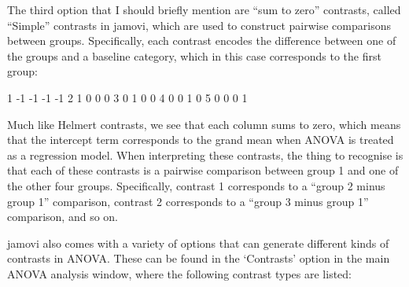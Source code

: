  
The third option that I should briefly mention are ``sum to zero'' contrasts, called ``Simple'' contrasts in jamovi, which are used to construct pairwise comparisons between groups. Specifically, each contrast encodes the difference between one of the groups and a baseline category, which in this case corresponds to the first group: 
\begin{rblock1}
1   -1   -1   -1   -1
2    1    0    0    0
3    0    1    0    0
4    0    0    1    0
5    0    0    0    1
\end{rblock1}  
Much like Helmert contrasts, we see that each column sums to zero, which means that the intercept term corresponds to the grand mean when ANOVA is treated as a regression model. When interpreting these contrasts, the thing to recognise is that each of these contrasts is a pairwise comparison between group 1 and one of the other four groups. Specifically, contrast 1 corresponds to a ``group 2 minus group 1'' comparison, contrast 2 corresponds to a ``group 3 minus group 1'' comparison, and so on. 


jamovi also comes with a variety of options that can generate different kinds of contrasts in ANOVA. These can be found in the `Contrasts' option in the main ANOVA analysis window, where the following contrast types are listed: 

